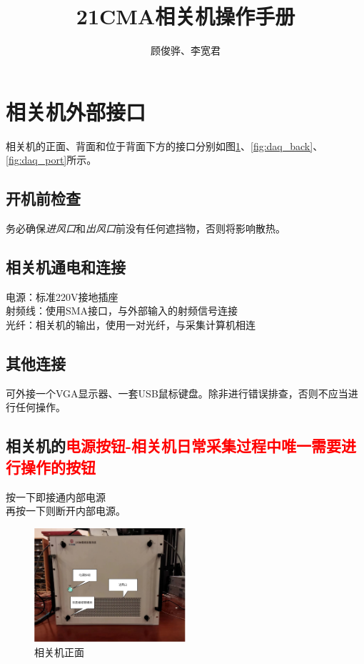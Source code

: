 \documentclass[11pt,includemp,a4paper]{article}
\title{21CMA相关机操作手册}
\author{顾俊骅、李宽君}
\begin{document}
\maketitle
\section{相关机外部接口}
相关机的正面、背面和位于背面下方的接口分别如图\ref{fig:daq_front}、\ref{fig:daq_back}、\ref{fig:daq_port}所示。
\subsection{开机前检查}
务必确保\textit{进风口}和\textit{出风口}前没有任何遮挡物，否则将影响散热。\\
\subsection{相关机通电和连接}
电源：标准220V接地插座\\
射频线：使用SMA接口，与外部输入的射频信号连接\\
光纤：相关机的输出，使用一对光纤，与采集计算机相连\\
\subsection{其他连接}
可外接一个VGA显示器、一套USB鼠标键盘。除非进行错误排查，否则不应当进行任何操作。\\

\subsection{相关机的\textcolor{red}{电源按钮-相关机日常采集过程中唯一需要进行操作的按钮}}
按一下即接通内部电源\\
再按一下则断开内部电源。\\
\begin{figure}
    \begin{center}
        \includegraphics[width=0.5\textwidth]{front.pdf}
    \end{center}
    \caption{\label{fig:daq_front}相关机正面}
\end{figure}
\end{document}
